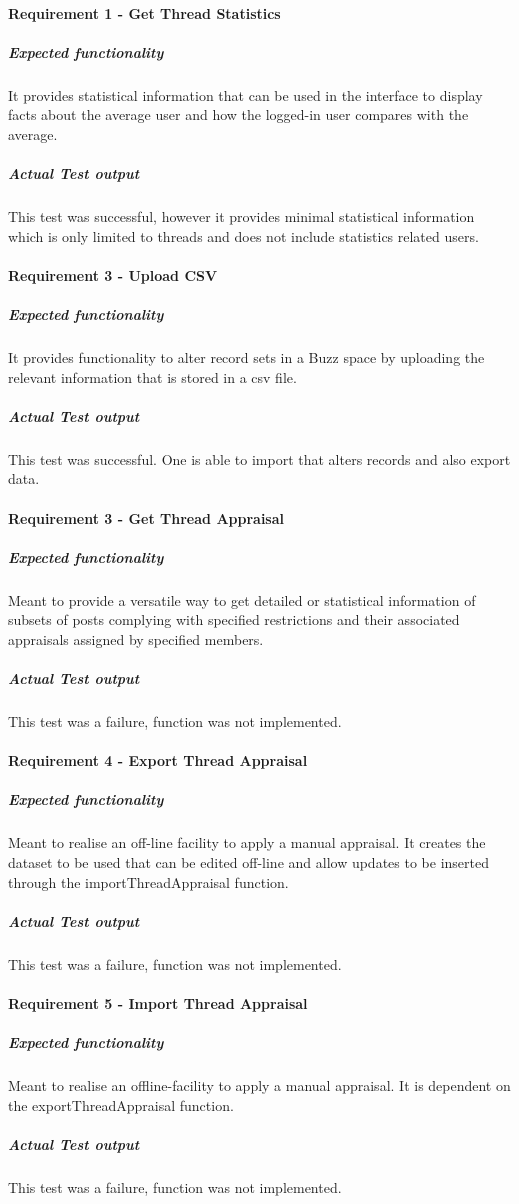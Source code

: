
\paragraph{Requirement 1 - Get Thread Statistics}
	\subparagraph{Expected functionality}
	It provides statistical information that can be used in the interface to display facts about the average user and how the logged-in user compares with the average.
	\subparagraph{Actual Test output}
	This test was successful, however it provides minimal statistical  information which is only limited to threads and does not include statistics related users.

\paragraph{Requirement 3 - Upload CSV}
	\subparagraph{Expected functionality}
	It provides functionality to alter record sets in a Buzz space by uploading the relevant information that is stored in a csv file.
	\subparagraph{Actual Test output}
This test was successful. One is able to import that alters records and also export data.

\paragraph{Requirement 3 - Get Thread Appraisal}
	\subparagraph{Expected functionality}
Meant to provide a versatile way to get detailed or statistical information of subsets of posts complying with specified restrictions and their associated appraisals assigned by specified members.
	\subparagraph{Actual Test output}
	This test was a failure, function was not implemented.
	 	
\paragraph{Requirement 4 - Export Thread Appraisal}
	\subparagraph{Expected functionality}
	Meant to realise an off-line facility to apply a manual appraisal. It creates the dataset to be used that can be edited off-line and allow updates to be inserted through the importThreadAppraisal function.
	\subparagraph{Actual Test output}
	This test was a failure, function was not implemented.
	
\paragraph{ Requirement 5 - Import Thread Appraisal}
	\subparagraph{Expected functionality}
	Meant to realise an offline-facility to apply a manual appraisal. It is dependent on the exportThreadAppraisal function.
	\subparagraph{Actual Test output}
	This test was a failure, function was not implemented.
	
